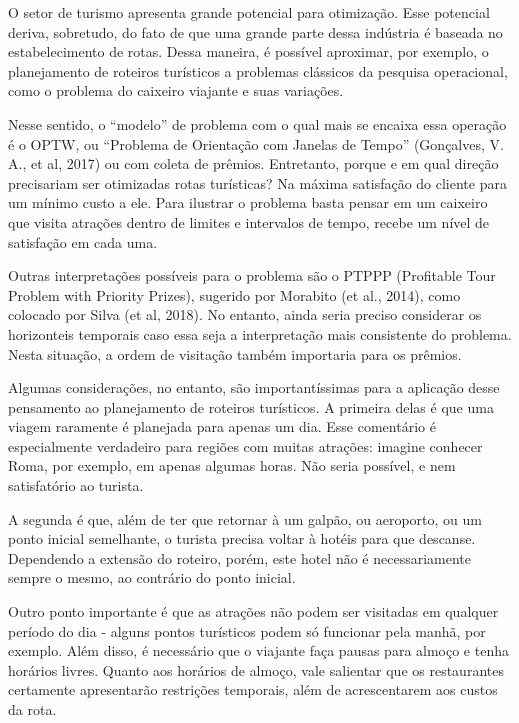 
O setor de turismo apresenta grande potencial para otimização. Esse potencial deriva, sobretudo, do fato de que uma grande parte dessa indústria é baseada no estabelecimento de rotas. Dessa maneira, é possível aproximar, por exemplo, o planejamento de roteiros turísticos a problemas clássicos da pesquisa operacional, como o problema do caixeiro viajante e suas variações.

Nesse sentido, o “modelo” de problema com o qual mais se encaixa essa operação é o OPTW, ou “Problema de Orientação com Janelas de Tempo” (Gonçalves, V. A., et al, 2017) ou com coleta de prêmios. Entretanto, porque e em qual direção precisariam ser otimizadas rotas turísticas? Na máxima satisfação do cliente para um mínimo custo a ele. Para ilustrar o problema basta pensar em um caixeiro que visita atrações dentro de limites e intervalos de tempo, recebe um nível de satisfação em cada uma.

Outras interpretações possíveis para o problema são o PTPPP (Profitable Tour Problem with Priority Prizes), sugerido por Morabito (et al., 2014), como colocado por Silva  (et al, 2018). No entanto, ainda seria preciso considerar os horizonteis temporais caso essa seja a interpretação mais consistente do problema. Nesta situação, a ordem de visitação também importaria para os prêmios.

Algumas considerações, no entanto, são importantíssimas para a aplicação desse pensamento ao planejamento de roteiros turísticos. A primeira delas é que uma viagem raramente é planejada para apenas um dia. Esse comentário é especialmente verdadeiro para regiões com muitas atrações: imagine conhecer Roma, por exemplo, em apenas algumas horas. Não seria possível, e nem satisfatório ao turista.

A segunda é que, além de ter que retornar à um galpão, ou aeroporto, ou um ponto inicial semelhante, o turista precisa voltar à hotéis para que descanse. Dependendo a extensão do roteiro, porém, este hotel não é necessariamente sempre o mesmo, ao contrário do ponto inicial.

Outro ponto importante é que as atrações não podem ser visitadas em qualquer período do dia - alguns pontos turísticos podem só funcionar pela manhã, por exemplo. Além disso, é necessário que o viajante faça pausas para almoço e tenha horários livres. Quanto aos horários de almoço, vale salientar que os restaurantes certamente apresentarão restrições temporais, além de acrescentarem aos custos da rota. 

